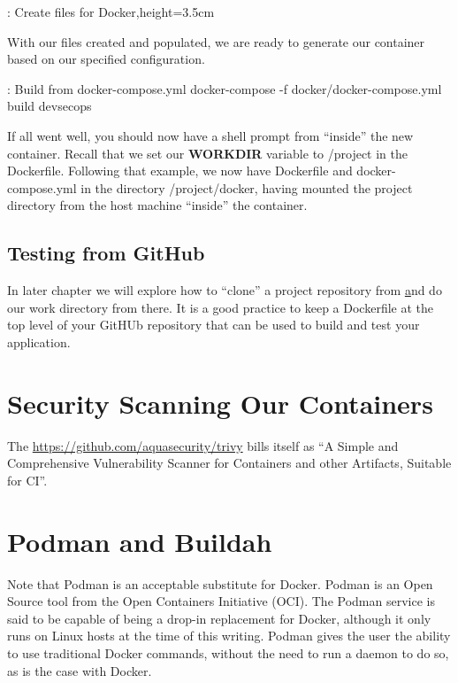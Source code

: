 \justify{}
\begin{mybox}{\thetcbcounter: Create files for Docker,height=3.5cm}
  
\end{mybox}

\justify{}
With our files created and populated, we are ready to generate our container based on our specified configuration.

\begin{mybox}{\thetcbcounter: Build from docker-compose.yml}
  docker-compose -f docker/docker-compose.yml build devsecops
\end{mybox}

\justify{}
If all went well, you should now have a shell prompt from ``inside'' the new container. Recall that we set our 
\textbf{WORKDIR} variable to /project in the Dockerfile. Following that example, we now have Dockerfile
and docker-compose.yml in the directory /project/docker, having mounted the project directory from the host machine 
``inside'' the container.

\subsection{Testing from GitHub}
\justify{}
In later chapter we will explore how to ``clone'' a project repository from \href{github.com} and do our work directory
from there. It is a good practice to keep a Dockerfile at the top level of your GitHUb repository that can be used to
build and test your application.

\section{Security Scanning Our Containers}
The \href{trivy container scanner}{https://github.com/aquasecurity/trivy} bills itself
as ``A Simple and Comprehensive Vulnerability Scanner for Containers and other
Artifacts, Suitable for CI''.


\section{Podman and Buildah}

\justify{}
Note that Podman is an acceptable substitute for Docker.
Podman is an Open Source tool from the Open
Containers Initiative (OCI). The Podman service is said to be capable
of being a drop-in replacement for Docker, although it only
runs on Linux hosts at the time of this writing. Podman gives
the user the ability to use traditional Docker commands,
without the need to run a daemon to do so\cite{podman}, as is
the case with Docker.

